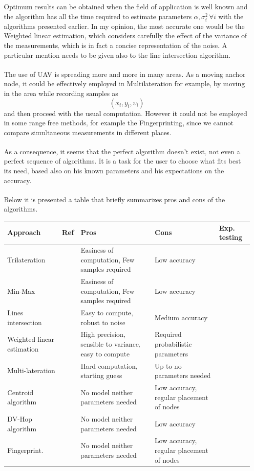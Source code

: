 \documentclass[12pt]{report}
\begin{document}
Optimum results can be obtained when the field of application is well known and the algorithm has all the time required to estimate parameters $\alpha,\sigma_i^2\,\forall i$ with the algorithms presented earlier. In my opinion, the most accurate one would be the Weighted linear estimation, which considers carefully the effect of the variance of the measurements, which is in fact a concise representation of the noise. A particular mention needs to be given also to the line intersection algorithm.\\\\
The use of UAV is spreading more and more in many areas. As a moving anchor node, it could be effectively employed in Multilateration for example, by moving in the area while recording samples as $$(x_i,y_i,\upsilon_i)$$ and then proceed with the usual computation. However it could not be employed in some range free methods, for example the Fingerprinting, since we cannot compare simultaneous measurements in different places.\\\\
As a consequence, it seems that the perfect algorithm doesn't exist, not even a perfect sequence of algorithms. It is a task for the user to choose what fits best its need, based also on his known parameters and his expectations on the accuracy.\\\\
Below it is presented a table that briefly summarizes pros and cons of the algorithms.

\begin{tabularx}{\textwidth}{|X|X|X|X|X|}
\hline
\textbf{Approach} & \textbf{Ref} & \textbf{Pros} & \textbf{Cons} & \textbf{Exp. testing}\\
\hline
Trilateration&\cite{rzk}&Easiness of computation, Few samples required&Low accuracy&\cite{inproceedings}\\
\hline
Min-Max&\cite{inproceedings}&Easiness of computation, Few samples required&Low accuracy&\cite{inproceedings}\\
\hline
    Lines intersection&\cite{rzk}&Easy to compute, robust to noise&Medium accuracy&\\
    \hline
    Weighted linear estimation&\cite{rzk}&High precision, sensible to variance, easy to compute&Required probabilistic parameters&\\
    \hline
    Multi-lateration&\cite{rzk}&Hard computation, starting guess&Up to no parameters needed&\cite{rzk}\\
    \hline
    Centroid algorithm&\cite{878533}&No model neither parameters needed&Low accuracy, regular placement of nodes&\cite{7061739}\\
    \hline
    DV-Hop algorithm&\cite{965964}&No model neither parameters needed&Low accuracy&\cite{jjd7e7diu}\\
    \hline
    Fingerprint.&\cite{YIU2017235}&No model neither parameters needed&Low accuracy, regular placement of nodes&\\
    \hline

\end{tabularx}
\end{document}
